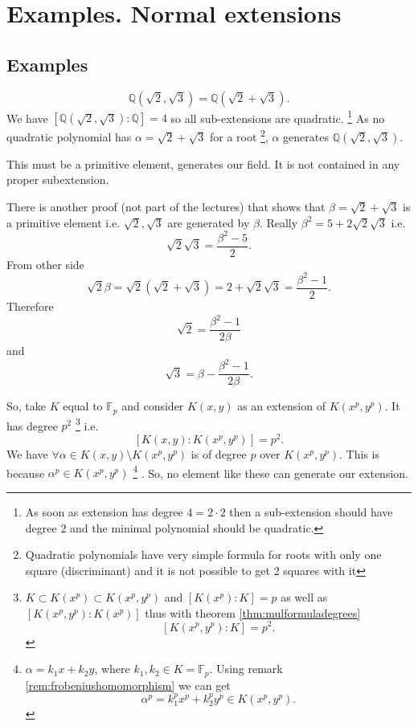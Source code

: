 \section{Examples. Normal extensions}

\subsection{Examples}

\begin{example}
  \[
  \mathbb{Q}\left(\sqrt{2}, \sqrt{3}\right) =
  \mathbb{Q}\left(\sqrt{2} + \sqrt{3}\right).
  \]
  We have
  $\left[\mathbb{Q}\left(\sqrt{2}, \sqrt{3}\right) :
    \mathbb{Q}\right] = 4$ so all sub-extensions are quadratic.
  \footnote{
    As soon as extension has degree $4 = 2 \cdot 2$ then a
    sub-extension should have 
    degree 2 and the minimal polynomial should be quadratic.
  }
  As no
  quadratic polynomial has $\alpha = \sqrt{2} + \sqrt{3}$ for a root
  \footnote{
    Quadratic polynomials have very simple formula for roots with
    only one square (discriminant) and it is not possible to get 2
    squares with it 
  },
  $\alpha$ generates $\mathbb{Q}\left(\sqrt{2}, \sqrt{3}\right)$.

  This must be a primitive element, generates our field. 
  It is not contained in any proper subextension.

  There is another proof (not part of the lectures) that shows that
  $\beta = \sqrt{2} + \sqrt{3}$ is a primitive element i.e.
  $\sqrt{2}, \sqrt{3}$ are generated by $\beta$. Really
  $\beta^2 = 5 + 2 \sqrt{2}\sqrt{3}$ i.e.
  \[
  \sqrt{2}\sqrt{3} = \frac{\beta^2 - 5}{2}.
  \]
  From other side
  \[
  \sqrt{2} \beta = \sqrt{2}\left(\sqrt{2} + \sqrt{3}\right) =
  2 + \sqrt{2}\sqrt{3} = \frac{\beta^2 - 1}{2}.
  \]
  Therefore
  \[
  \sqrt{2} = \frac{\beta^2 - 1}{2 \beta}
  \]
  and
  \[
  \sqrt{3} = \beta - \frac{\beta^2 - 1}{2 \beta}.
  \]
  \label{ex:lec5_primitiveelement}
\end{example}

\begin{example}
  So, take $K$ equal to $\mathbb{F}_p$ and consider
  $K\left(x,y\right)$ as an
  extension of $K\left(x^p,y^p\right)$. It has degree $p^2$
  \footnote {
    $K \subset K\left(x^p\right) \subset K\left(x^p,y^p\right)$ and
    $\left[K\left(x^p\right): K\right] = p$ as well as
    $\left[K\left(x^p, y^p\right): K\left(x^p\right)\right]$ thus with
    theorem \ref{thm:mulformuladegrees}
    \[
    \left[K\left(x^p, y^p\right): K\right] = p^2.
    \]
  }
  i.e.
  \[
  \left[
    K\left(x,y\right) : K\left(x^p,y^p\right)
    \right] = p^2.
  \]
  We have $\forall \alpha \in K\left(x,y\right) \setminus
  K\left(x^p,y^p\right)$ is of degree $p$ over
  $K\left(x^p,y^p\right)$. This is because
  $\alpha^p \in K\left(x^p,y^p\right)$
  \footnote{
    $\alpha = k_1 x + k_2 y$, where $k_1, k_2 \in K =
    \mathbb{F}_p$. Using remark \ref{rem:frobeniushomomorphism} we can
    get
    \[
    \alpha^p = k_1^p x^p + k_2^p y^p \in K\left(x^p, y^p\right).
    \]
  }
  . So, no element like these can
  generate our extension.  
\end{example}

